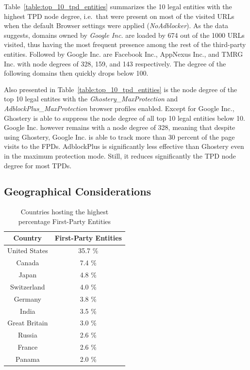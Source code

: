 \documentclass[compsoc, conference, letterpaper, 10pt, times]{IEEEtran}
\begin{document}
Table~\ref{table:top_10_tpd_entities} summarizes the 10 legal entities with the highest TPD node degree, i.e.\ that were present on most of the visited URLs when the default Browser settings were applied (\textit{NoAdblocker}). As the data suggests, domains owned by \textit{Google Inc.} are loaded by 674 out of the 1000 URLs visited, thus having the most frequent presence among the rest of the third-party entities. Followed by Google Inc. are Facebook Inc., AppNexus Inc., and TMRG Inc. with node degrees of 328, 159, and 143 respectively. The degree of the following domains then quickly drops below 100.

Also presented in Table~\ref{table:top_10_tpd_entities} is the node degree of the top 10 legal entites with the \textit{Ghostery\_MaxProtection} and \textit{AdblockPlus\_MaxProtection} browser profiles enabled. Except for Google Inc., Ghostery is able to suppress the node degree of all top 10 legal entities below 10. Google Inc. however remains with a node degree of 328, meaning that despite using Ghostery, Google Inc. is able to track more than 30 percent of the page visits to the FPDs. AdblockPlus is significantly less effective than Ghostery even in the maximum protection mode. Still, it reduces significantly the TPD node degree for most TPDs.




\subsection{Geographical Considerations}


  \begin{table}
  \centering
  \begin{tabular}{|c|c|}
  \hline
  Country & First-Party Entities \\
  \hline
  United States & 35.7 \% \\
  Canada & 7.4 \% \\
  Japan & 4.8 \% \\
  Switzerland & 4.0 \% \\
  Germany & 3.8 \% \\
  India & 3.5 \% \\
  Great Britain & 3.0 \% \\
  Russia & 2.6 \% \\
  France & 2.6 \% \\
  Panama & 2.0 \% \\
  \hline
  \end{tabular}
  \caption{Countries hosting the highest percentage First-Party Entities}
  \label{table:top_10_first_party_countries}
  \end{table}
\end{document}
